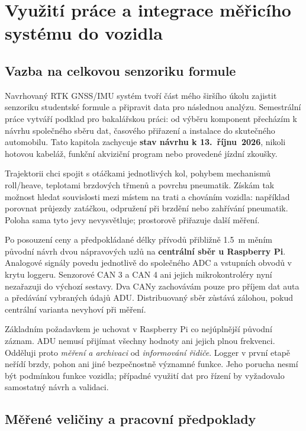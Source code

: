 \chapter{Využití práce a integrace měřicího systému do vozidla}
\label{chap:integrace}

\section{Vazba na celkovou senzoriku formule}

Navrhovaný RTK GNSS/IMU systém tvoří část mého širšího úkolu zajistit
senzoriku studentské formule a připravit data pro následnou analýzu.
Semestrální práce vytváří podklad pro bakalářskou práci: od výběru
komponent přecházím k návrhu společného sběru dat, časového přiřazení
a instalace do skutečného automobilu. Tato kapitola zachycuje
\textbf{stav návrhu k 13.~říjnu~2026}, nikoli hotovou kabeláž,
funkční akviziční program nebo provedené jízdní zkoušky.

Trajektorii chci spojit s otáčkami jednotlivých kol, pohybem mechanismů
roll/heave, teplotami brzdových třmenů a povrchu pneumatik. Získám tak
možnost hledat souvislosti mezi místem na trati a chováním vozidla:
například porovnat průjezdy zatáčkou, odpružení při brzdění nebo zahřívání
pneumatik. Poloha sama tyto jevy nevysvětluje; prostorově přiřazuje další měření.

Po posouzení ceny a předpokládané délky přívodů přibližně \SI{1.5}{m}
měním původní návrh dvou nápravových uzlů na \textbf{centrální sběr u
Raspberry Pi}. Analogové signály povedu jednotlivě do společného ADC
a vstupních obvodů v krytu loggeru. Senzorové CAN 3 a CAN 4 ani jejich
mikrokontroléry nyní nezařazuji do výchozí sestavy. Dva CANy zachovávám
pouze pro příjem dat auta a předávání vybraných údajů ADU. Distribuovaný
sběr zůstává zálohou, pokud centrální varianta nevyhoví při měření.

Základním požadavkem je uchovat v Raspberry Pi co nejúplnější původní
záznam. ADU nemusí přijímat všechny hodnoty ani jejich plnou frekvenci.
Odděluji proto \emph{měření a archivaci} od \emph{informování řidiče}.
Logger v první etapě neřídí brzdy, pohon ani jiné bezpečnostně významné
funkce. Jeho porucha nesmí být podmínkou funkce vozidla; případné využití
dat pro řízení by vyžadovalo samostatný návrh a validaci.

\section{Měřené veličiny a pracovní předpoklady}

